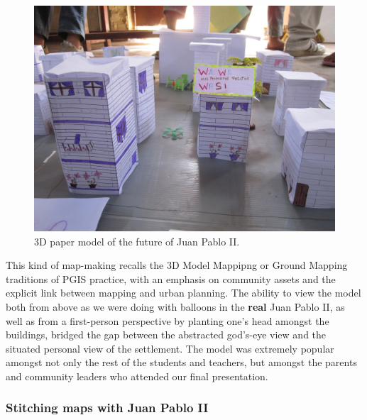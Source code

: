 \documentclass[11pt]{report}
\begin{document}
\begin{figure}[h]
  \begin{center}
	\includegraphics[width=1\textwidth]{images/juan-pablo-maqueta.jpg}
	\caption{3D paper model of the future of Juan Pablo II.}
  \end{center}
\end{figure}

This kind of map-making recalls the 3D Model Mappipng or Ground Mapping traditions of PGIS practice, with an emphasis on community assets and the explicit link between mapping and urban planning. The ability to view the model both from above as we were doing with balloons in the \textbf{real} Juan Pablo II, as well as from a first-person perspective by planting one's head amongst the buildings, bridged the gap between the abstracted god's-eye view and the situated personal view of the settlement. The model was extremely popular amongst not only the rest of the students and teachers, but amongst the parents and community leaders who attended our final presentation. 

\subsubsection{Stitching maps with Juan Pablo II}
\end{document}
